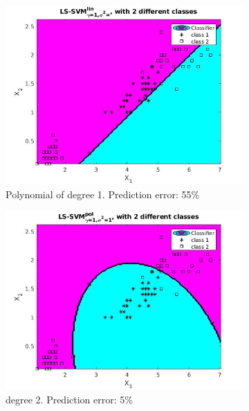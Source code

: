 \documentclass{article}
\begin{document}
    \begin{figure}[]
        \begin{subfigure}{0.33\linewidth}
            \includegraphics[width=\linewidth]{iris_linear}
            \caption{Polynomial of degree 1. Prediction error: 55\%}
        \end{subfigure}
        \begin{subfigure}{0.33\linewidth}
            \includegraphics[width=\linewidth]{iris_degree2}
            \caption{degree 2.
Prediction error: 5\%}
        \end{subfigure}
        \begin{subfigure}{0.33\linewidth}

\end{subfigure}
\end{figure}
\end{document}
